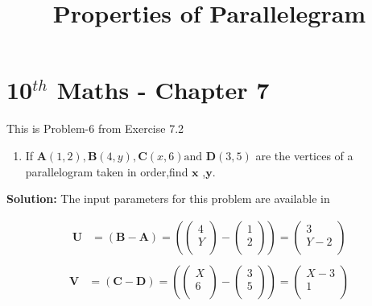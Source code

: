 \documentclass[12pt]{article}
\providecommand{\brak}[1]{\ensuremath{\left(#1\right)}}
\newcommand{\solution}{\noindent \textbf{Solution: }}
\newcommand{\myvec}[1]{\ensuremath{\begin{pmatrix}#1\end{pmatrix}}}
\let\vec\mathbf
\begin{document}
\begin{center}
\title{\textbf{Properties of Parallelegram}}
\date{\vspace{-5ex}} %
\maketitle
\end{center}

\setcounter{page}{1}

\section{10$^{th}$ Maths - Chapter 7}

This is Problem-6 from Exercise 7.2

\begin{enumerate}
\item If $\vec{A}(1, 2),\vec{B}(4, y),\vec{C}(x, 6) \text{and } \vec{D}(3, 5)$ are the vertices of a parallelogram taken in order,find $\vec{x}$ ,$\vec{y}$.
\end{enumerate}

\solution The input parameters for this problem are available in
\begin{center}
\begin{table}[ht!]
	
\caption{}
\label{table}	
\end{table}
\end{center}
\begin{align}
  \label{eq:det2f}
  \vec{U} &=\brak{\vec{B}-\vec{A}} = \brak{\myvec{
  4 \\
  Y \\
 } - \myvec{
  1 \\
  2 \\
 } 
 } = \myvec{
 3 \\
 Y-2 \\
 }   \\
 \end{align}
 \begin{align}
   \vec{V} &= \brak{\vec{C}-\vec{D}} = \brak{\myvec{
  X \\
  6 \\
 } - \myvec{
  3 \\
  5 \\
 } 
 } = \myvec{
 X-3 \\
 1 \\
 }   \\
 \end{align}
  
\end{document}
